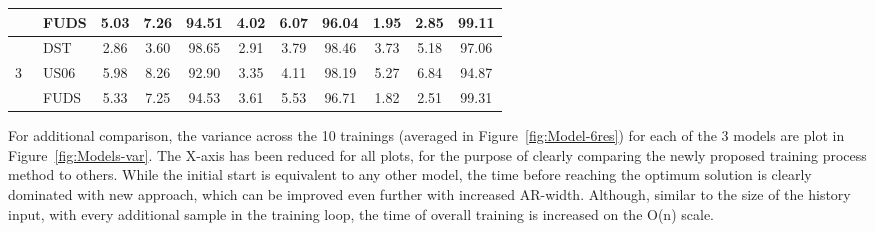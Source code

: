 {\begin{table*}[!ht]
{\begin{tabular}{ c l c c c c c c c c c}
        & FUDS & 5.03 & 7.26 & 94.51 & 4.02 & 6.07 & 96.04 & 1.95 & 2.85 & 99.11 \\ 
    \hline
        & DST & 2.86 & 3.60 & 98.65 & 2.91 & 3.79 & 98.46 & 3.73 & 5.18 & 97.06 \\ 
    3~\cite{sadykov_practical_2022} & US06 & 5.98 & 8.26 & 92.90 & 3.35 & 4.11 & 98.19 & 5.27 & 6.84 & 94.87 \\ 
        & FUDS & 5.33 & 7.25 & 94.53 & 3.61 & 5.53 & 96.71 & 1.82 & 2.51 & 99.31 \\ 
    \hline\hline
\end{tabular}
}
\end{table*}
}

For additional comparison, the variance across the 10 trainings (averaged in Figure~\ref{fig:Model-6res}) for each of the 3 models are plot in Figure~\ref{fig:Models-var}.
The X-axis has been reduced for all plots, for the purpose of clearly comparing the newly proposed training process method to others.
While the initial start is equivalent to any other model, the time before reaching the optimum solution is clearly dominated with new approach, which can be improved even further with increased AR-width.
Although, similar to the size of the history input, with every additional sample in the training loop, the time of overall training is increased on the O(n) scale.
\begin{figure*}[!h]
    \centering
    \vspace{-3ex}
    \hfill
    \hfill
    \caption{Variance comparison plot visualisation, where Max and Min lines outline the limits of the best and worst case histories and \textcolor{blue}{average of 10 attempts} being the overall performance.}
    \label{fig:Models-var}
\end{figure*}

